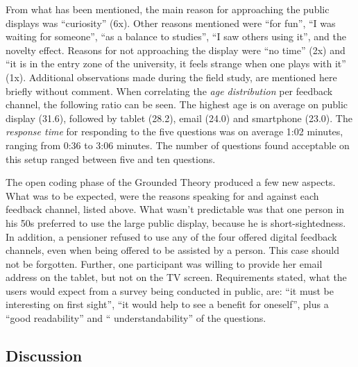 	From what has been mentioned, the main reason for approaching the public displays was ``curiosity'' (6x). Other reasons mentioned were ``for fun'', ``I was waiting for someone'', ``as a balance to studies'', ``I saw others using it'', and the novelty effect. Reasons for not approaching the display were ``no time'' (2x) and ``it is in the entry zone of the university, it feels strange when one plays with it'' (1x).
	Additional observations made during the field study, are mentioned here briefly without comment.
	When correlating the \textit{age distribution} per feedback channel, the following ratio can be seen. The highest age is on average on public display (31.6), followed by tablet (28.2), email (24.0) and smartphone (23.0).
	The \textit{response time} for responding to the five questions was on average 1:02 minutes, ranging from 0:36 to 3:06 minutes.
	The number of questions found acceptable on this setup ranged between five and ten questions.


	The open coding phase of the Grounded Theory produced a few new aspects. What was to be expected, were the reasons speaking for and against each feedback channel, listed above. What wasn't predictable was that one person in his 50s preferred to use the large public display, because he is short-sightedness. In addition, a pensioner refused to use any of the four offered digital feedback channels, even when being offered to be assisted by a person. This case should not be forgotten. Further, one participant was willing to provide her email address on the tablet, but not on the TV screen.
	Requirements stated, what the users would expect from a survey being conducted in public, are: ``it must be interesting on first sight'', ``it would help to see a benefit for oneself'', plus a ``good readability'' and `` understandability'' of the questions.

	








\clearpage
\subsection{Discussion}



